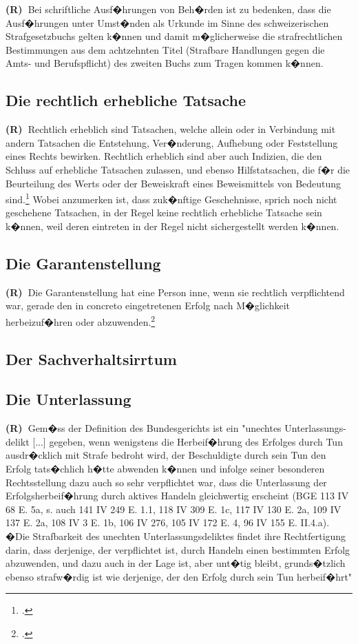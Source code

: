 \documentclass[paper=a4,fontsize=12pt, oneside, numbers=noenddot]{scrbook}
\newcounter{rz}
\newcommand{\Rz}{\addtocounter{rz}{1}\textbf{(R\arabic{rz})~}}
\begin{document}
	\Rz Bei schriftliche Ausf�hrungen von Beh�rden ist zu bedenken, dass die Ausf�hrungen unter Umst�nden als Urkunde im Sinne des schweizerischen Strafgesetzbuchs gelten k�nnen und damit m�glicherweise die strafrechtlichen Bestimmungen aus dem  achtzehnten Titel (Strafbare Handlungen gegen die Amts- und Berufspflicht) des zweiten Buchs zum Tragen kommen k�nnen.
	
	\subsection{Die rechtlich erhebliche Tatsache}\label{Recht:Tatsache}
	\Rz Rechtlich erheblich sind Tatsachen, welche allein oder in Verbindung mit andern Tatsachen die Entstehung, Ver�nderung, Aufhebung oder Feststellung eines Rechts bewirken. Rechtlich erheblich sind aber auch Indizien, die den Schluss auf erhebliche Tatsachen zulassen, und ebenso Hilfstatsachen, die f�r die Beurteilung des Werts oder der Beweiskraft eines Beweismittels von Bedeutung sind.\footcite[E. 3a]{BGE113IV77} Wobei anzumerken ist, dass zuk�nftige Geschehnisse, sprich noch nicht geschehene Tatsachen, in der Regel keine rechtlich erhebliche Tatsache sein k�nnen, weil deren eintreten in der Regel nicht sichergestellt werden k�nnen. 
	
	\subsection{Die Garantenstellung}\label{Recht:Garantenstellung}
	\Rz Die Garantenstellung hat eine Person inne, wenn sie rechtlich verpflichtend war, gerade den in concreto eingetretenen Erfolg nach M�glichkeit herbeizuf�hren oder abzuwenden.\footcite[Art. 11, Rz 11]{2021:Trechsler:StGBPraxisK}  
	
	\subsection{Der Sachverhaltsirrtum}
	
	\subsection{Die Unterlassung}\label{Recht:Unterlassung}
	\Rz Gem�ss der Definition des Bundesgerichts ist ein "unechtes Unterlassungs- delikt [...] gegeben, wenn wenigstens die Herbeif�hrung des Erfolges durch Tun ausdr�cklich mit Strafe bedroht wird, der Beschuldigte durch sein Tun den Erfolg tats�chlich h�tte abwenden k�nnen und infolge seiner besonderen Rechtsstellung dazu auch so sehr verpflichtet war, dass die Unterlassung der Erfolgsherbeif�hrung durch aktives Handeln gleichwertig erscheint (BGE 113 IV 68 E. 5a, s. auch 141 IV 249 E. 1.1, 118 IV 309 E. 1c, 117 IV 130 E. 2a, 109 IV 137 E. 2a, 108 IV 3 E. 1b, 106 IV 276, 105 IV 172 E. 4, 96 IV 155 E. II.4.a). �Die Strafbarkeit des unechten Unterlassungsdeliktes findet ihre Rechtfertigung darin, dass derjenige, der verpflichtet ist, durch Handeln einen bestimmten Erfolg abzuwenden, und dazu auch in der Lage ist, aber unt�tig bleibt, grunds�tzlich ebenso strafw�rdig ist wie derjenige, der den Erfolg durch sein Tun herbeif�hrt" 
\end{document}

